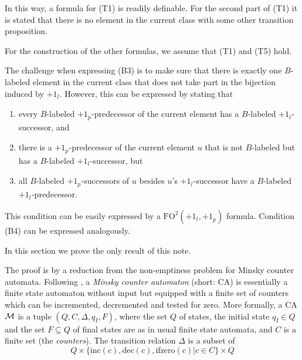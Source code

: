 \documentclass[11pt, a4paper]{article}
\renewcommand{\(}{\left (}
\renewcommand{\)}{\right )}
\newcommand{\myemph}[1]{\emph{#1}}
\theoremstyle{plain}
\newenvironment{proofof} [1]{\noindent{\bf Proof (of #1).}\enspace}{\qed  \vspace{2mm}}
\newcommand{\fotwo}{\ensuremath{\mathrm{FO}^2}\xspace}
\newcommand{\psucc}[1][]{\ensuremath{{+1}_{p_{#1}}}}
\newcommand{\lsucc}[1][]{\ensuremath{{+1_{l_{#1}}}}}
\newcommand {\calM}      {{\cal M}\xspace}
\newcommand{\inc}{\ensuremath{\text{inc}}}
\newcommand{\dec}{\ensuremath{\text{dec}}}
\newcommand{\ifzero}{\ensuremath{\text{ifzero}}}
\newcommand{\ifz}{\ifzero}
\begin{document}
{In this way, a formula for (T1) is readily definable. For the second part of (T1) it is stated that there is no element in the current class with some other transition proposition. 


For the construction of the other formulas, we assume that (T1) and (T5) hold. 

The challenge when expressing (B3) is to make sure that there is exactly one $B$-labeled element in the current class that does not take part in the bijection induced by $\lsucc$. However, this can be expressed by stating that
\begin{enumerate}[(1)]
\item every $B$-labeled \psucc-predecessor of the current element has a $B$-labeled \lsucc-successor, and
\item there is a \psucc-predecessor of the current element $u$ that is not $B$-labeled but has a $B$-labeled \lsucc-successor, but
\item all $B$-labeled \psucc-successors of $u$ besides $u$'s \lsucc-successor have a $B$-labeled \lsucc-predecessor.
\end{enumerate}
This condition can be easily expressed by a $\fotwo (\lsucc, \psucc)$ formula.
Condition (B4) can be expressed analogously.
}

\newcommand{\prooflsps}{
  \begin{proof}
    \prooftextlsps
  \end{proof}
}

\newcommand{\proofoflsps}{
  \begin{proofof}{Theorem \ref{prop:lsps}}
    \prooftextlsps
  \end{proofof}
}

 

In this section we prove the only result of this note.
\theoremlsps

The proof is by a reduction from the non-emptiness problem for Minsky counter automata. Following \cite{BojanczykMSS2009}, a \myemph{Minsky counter automaton} (short: CA) is essentially a finite state automaton without input but equipped with a finite set of counters which can be incremented, decremented and tested for zero. More formally, a CA $\calM$ is a tuple $(Q, C,\Delta, q_I , F )$, where the set $Q$ of states, the initial state $q_I \in Q$ and the set $F \subseteq Q$ of final states are as in usual finite state automata, and $C$ is a finite set (the \myemph{counters}). The transition relation $\Delta$ is a subset of $$Q \times \{\inc(c), \dec(c), \ifz(c) | c \in C\} \times Q$$ 
\end{document}
